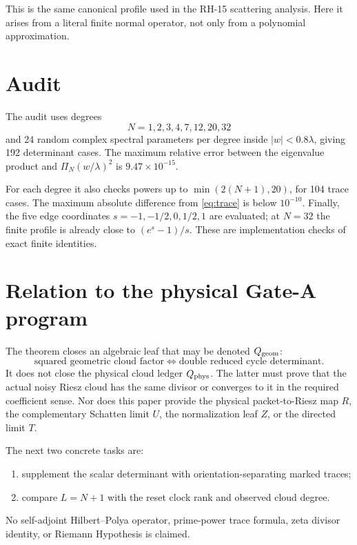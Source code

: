 \documentclass[12pt]{article}
\theoremstyle{remark}
\begin{document}
This is the same canonical profile used in the RH-15 scattering analysis.
Here it arises from a literal finite normal operator, not only from a
polynomial approximation.

\section{Audit}

The audit uses degrees
\[
 N=1,2,3,4,7,12,20,32
\]
and 24 random complex spectral parameters per degree inside
$|w|<0.8\lambda$, giving 192 determinant cases.  The maximum relative error
between the eigenvalue product and $\Pi_N(w/\lambda)^2$ is
$9.47\times10^{-15}$.

For each degree it also checks powers up to
$\min(2(N+1),20)$, for 104 trace cases.  The maximum absolute difference from
\eqref{eq:trace} is below $10^{-10}$.  Finally, the five edge coordinates
$s=-1,-1/2,0,1/2,1$ are evaluated; at $N=32$ the finite profile is already
close to $(e^s-1)/s$.  These are implementation checks of exact finite
identities.

\section{Relation to the physical Gate-A program}

The theorem closes an algebraic leaf that may be denoted
$Q_{\rm geom}$:
\[
 \text{squared geometric cloud factor}
 \Longleftrightarrow
 \text{double reduced cycle determinant}.
\]
It does not close the physical cloud ledger $Q_{\rm phys}$.  The latter must
prove that the actual noisy Riesz cloud has the same divisor or converges to
it in the required coefficient sense.  Nor does this paper provide the
physical packet-to-Riesz map $R$, the complementary Schatten limit $U$, the
normalization leaf $Z$, or the directed limit $T$.

The next two concrete tasks are:
\begin{enumerate}[leftmargin=2em]
\item supplement the scalar determinant with orientation-separating marked
traces;
\item compare $L=N+1$ with the reset clock rank and observed cloud degree.
\end{enumerate}
No self-adjoint Hilbert--Polya operator, prime-power trace formula, zeta
divisor identity, or Riemann Hypothesis is claimed.



\end{document}
